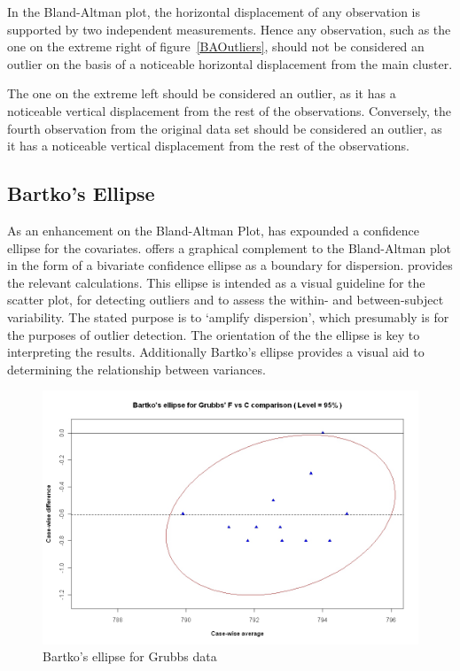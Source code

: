 \documentclass[12pt, a4paper]{report}
\theoremstyle{plain}
\theoremstyle{definition}
\theoremstyle{remark}
\begin{document}
In the Bland-Altman plot, the horizontal displacement of any observation is supported by two independent measurements. Hence any observation, such as the one on the extreme right of figure~\ref{BAOutliers}, should not be considered an outlier on the basis of a noticeable horizontal displacement from the main cluster. 

The one	on the extreme left should be considered an outlier, as it has a noticeable vertical displacement from the rest of the observations. Conversely, the fourth observation from the original data set should be considered an outlier, as it has a noticeable vertical displacement from the rest of the observations.

\subsection{Bartko's Ellipse}

As an enhancement on the Bland-Altman Plot, \citet{Bartko} has
expounded a confidence ellipse for the covariates. \citet{Bartko} offers a graphical complement to the Bland-Altman
plot in the form of a bivariate confidence ellipse as a boundary for dispersion. \citet{AltmanEllipse} provides the relevant calculations. This ellipse is intended as a visual guideline for the scatter plot, for detecting outliers and to assess the within- and between-subject variability. The stated purpose is to `amplify dispersion', which presumably is for the purposes of outlier detection. The orientation of the the ellipse is key to interpreting the results. Additionally Bartko's ellipse provides a visual aid to determining the relationship between variances. 



\begin{figure}[h!]
	\includegraphics[width=130mm]{images/GrubbsBartko.jpeg}
	\caption{Bartko's ellipse for Grubbs data}\label{GrubbsBartko}
\end{figure}
\end{document}

